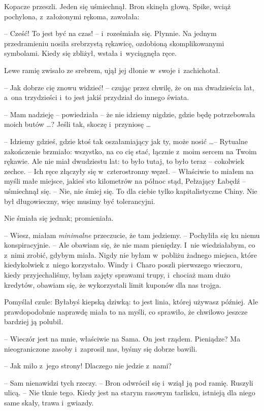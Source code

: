 \documentclass[oneside,polish,11pt,rmheadings]{mwbk}
\begin{document}
Kopacze przeszli. Jeden się uśmiechnął. Bron skinęła głową. Spike, wciąż pochylona, z~założonymi rękoma, zawołała: 

-- Cześć! To jest być na czas! -- i~roześmiała się. Płynnie. Na jednym przedramieniu nosiła srebrzystą rękawicę, ozdobioną skomplikowanymi symbolami. Kiedy się zbliżył, wstała i~wyciągnęła ręce. 

Lewe ramię zwisało ze srebrem, ujął jej dłonie w~swoje i~zachichotał. 

-- Jak dobrze cię znowu widzieć! -- czując przez chwilę, że on ma dwadzieścia lat, a~ona trzydzieści i~to jest jakiś przydział do innego świata. 

-- Mam nadzieję -- powiedziała -- że nie idziemy nigdzie, gdzie będę potrzebowała moich butów \ldots ? Jeśli tak, skoczę i~przyniosę \ldots  

-- Idziemy gdzieś, gdzie ktoś tak oszałamiający jak ty, może nosić \ldots  -- Rytualne zakończenie brzmiało: wszystko, na co cię stać, łącznie z~moim sercem na Twoim rękawie. Ale nie miał dwudziestu lat: to było tutaj, to było teraz -- cokolwiek zechce. -- Ich ręce złączyły się w~czterostronny węzeł. -- Właściwie to miałem na myśli małe miejsce, jakieś sto kilometrów na północ stąd, Pełzający Łabędź -- uśmiechnął się. -- Nie, nie śmiej się. To dla ciebie tylko kapitalistyczne Chiny. Nie był długowieczny, więc musimy być tolerancyjni. 

Nie śmiała się jednak; promieniała. 

-- Wiesz, miałam \textit{minimalne} przeczucie, że tam jedziemy. -- Pochyliła się ku niemu konspiracyjnie. -- Ale obawiam się, że nie mam pieniędzy. I~nie wiedziałabym, co z~nimi zrobić, gdybym miała. Nigdy nie byłam w~pobliżu żadnego miejsca, które kiedykolwiek z~niego korzystało. Windy i~Charo poszli pierwszego wieczoru, kiedy przyjechaliśmy, byłam zajęty sprawami trupy, i~chociaż mam dużo kredytów, obawiam się, że wykorzystali limit kuponów dla nas trojga. 

Pomyślał czule: Byłabyś kiepską dziwką: to jest linia, której używasz później. Ale prawdopodobnie naprawdę miała to na myśli, co sprawiło, że chwilowo jeszcze bardziej ją polubił. 

-- Wieczór jest na mnie, właściwie na Sama.  On jest rządem. Pieniądze? Ma nieograniczone zasoby i~zaprosił nas, byśmy się dobrze bawili. 

-- Jak miło z~jego strony! Dlaczego nie jedzie z~nami? 

-- Sam nienawidzi tych rzeczy. -- Bron odwrócił się i~wziął ją pod ramię. Ruszyli ulicą. -- Nie tknie tego. Kiedy jest na starym rasowym tarlisku, istnieją dla niego same skały, trawa i~gwiazdy. 
\end{document}
